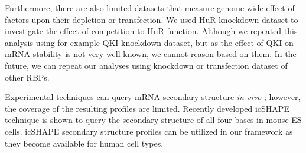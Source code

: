 Furthermore, there are also limited datasets that measure genome-wide effect of factors upon their depletion or transfection. We used HuR knockdown dataset to investigate the effect of competition to HuR function. Although we repeated this analysis using for example QKI knockdown dataset, but as the effect of QKI on mRNA stability is not very well known, we cannot reason based on them. In the future, we can repeat our analyses using knockdown or transfection dataset of other RBPs.

Experimental techniques can query mRNA secondary structure \textit{in vivo} \cite{rouskin_14, wan_14}; however, the coverage of the resulting profiles are limited. Recently developed icSHAPE technique \cite{spitale_15} is shown to query the secondary structure of all four bases in mouse ES cells. icSHAPE secondary structure profiles can be utilized in our framework as they become available for human cell types. 